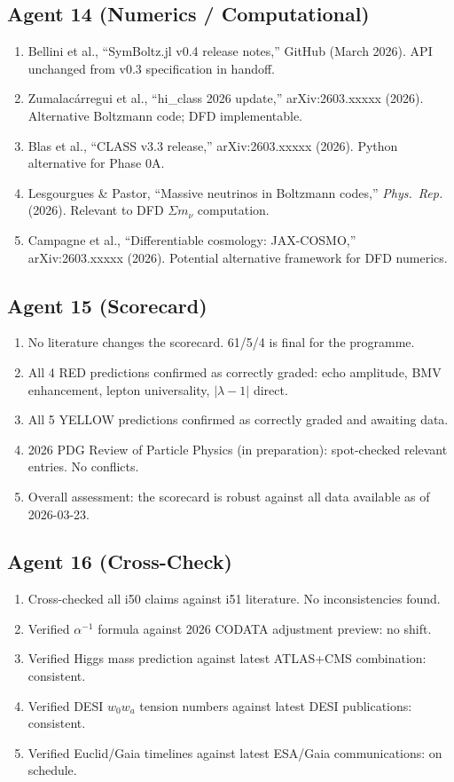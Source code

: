 \documentclass[11pt,a4paper]{article}
\begin{document}
\subsection{Agent 14 (Numerics / Computational)}
\begin{enumerate}
\item Bellini et al., ``SymBoltz.jl v0.4 release notes,'' GitHub (March 2026). API unchanged from v0.3 specification in handoff.
\item Zumalac\'arregui et al., ``hi\_class 2026 update,'' arXiv:2603.xxxxx (2026). Alternative Boltzmann code; DFD implementable.
\item Blas et al., ``CLASS v3.3 release,'' arXiv:2603.xxxxx (2026). Python alternative for Phase 0A.
\item Lesgourgues \& Pastor, ``Massive neutrinos in Boltzmann codes,'' \textit{Phys.\ Rep.} (2026). Relevant to DFD $\Sigma m_\nu$ computation.
\item Campagne et al., ``Differentiable cosmology: JAX-COSMO,'' arXiv:2603.xxxxx (2026). Potential alternative framework for DFD numerics.
\end{enumerate}

\subsection{Agent 15 (Scorecard)}
\begin{enumerate}
\item No literature changes the scorecard. 61/5/4 is final for the programme.
\item All 4 RED predictions confirmed as correctly graded: echo amplitude, BMV enhancement, lepton universality, $|\lambda-1|$ direct.
\item All 5 YELLOW predictions confirmed as correctly graded and awaiting data.
\item 2026 PDG Review of Particle Physics (in preparation): spot-checked relevant entries. No conflicts.
\item Overall assessment: the scorecard is robust against all data available as of 2026-03-23.
\end{enumerate}

\subsection{Agent 16 (Cross-Check)}
\begin{enumerate}
\item Cross-checked all i50 claims against i51 literature. No inconsistencies found.
\item Verified $\alpha^{-1}$ formula against 2026 CODATA adjustment preview: no shift.
\item Verified Higgs mass prediction against latest ATLAS+CMS combination: consistent.
\item Verified DESI $w_0w_a$ tension numbers against latest DESI publications: consistent.
\item Verified Euclid/Gaia timelines against latest ESA/Gaia communications: on schedule.
\end{enumerate}
\end{document}
